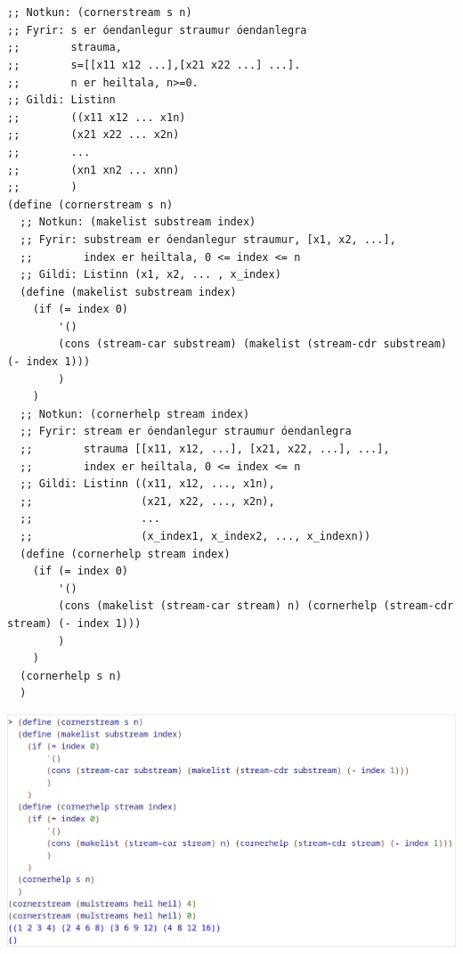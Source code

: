 \documentclass{article}
\begin{document}
	\section{}
	\begin{verbatim}
;; Notkun: (cornerstream s n)
;; Fyrir: s er óendanlegur straumur óendanlegra
;;        strauma,
;;        s=[[x11 x12 ...],[x21 x22 ...] ...].
;;        n er heiltala, n>=0.
;; Gildi: Listinn
;;        ((x11 x12 ... x1n)
;;        (x21 x22 ... x2n)
;;        ...
;;        (xn1 xn2 ... xnn)
;;        )
(define (cornerstream s n)
  ;; Notkun: (makelist substream index)
  ;; Fyrir: substream er óendanlegur straumur, [x1, x2, ...],
  ;;        index er heiltala, 0 <= index <= n
  ;; Gildi: Listinn (x1, x2, ... , x_index)
  (define (makelist substream index)
    (if (= index 0)
        '()
        (cons (stream-car substream) (makelist (stream-cdr substream) (- index 1)))
        )
    )
  ;; Notkun: (cornerhelp stream index)
  ;; Fyrir: stream er óendanlegur straumur óendanlegra
  ;;        strauma [[x11, x12, ...], [x21, x22, ...], ...],
  ;;        index er heiltala, 0 <= index <= n
  ;; Gildi: Listinn ((x11, x12, ..., x1n),
  ;;                 (x21, x22, ..., x2n),
  ;;                 ...
  ;;                 (x_index1, x_index2, ..., x_indexn))
  (define (cornerhelp stream index)
    (if (= index 0)
        '()
        (cons (makelist (stream-car stream) n) (cornerhelp (stream-cdr stream) (- index 1)))
        )
    )
  (cornerhelp s n)
  )
	\end{verbatim}
	\begin{center}
		\includegraphics[scale=0.35]{cornerstream.png}
	\end{center}

	\newpage
\end{document}
